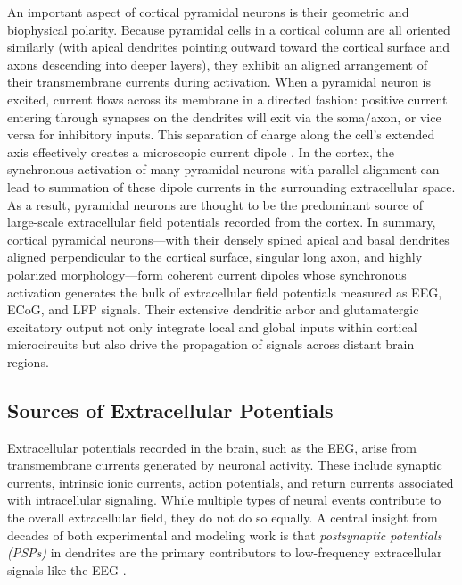 \documentclass[final, a4paper,masters,en,listoffigures,listoftables,norwegiandates]{NMBU}
\begin{document}
An important aspect of cortical pyramidal neurons is their geometric and biophysical polarity. Because pyramidal cells in a cortical column are all oriented similarly (with apical dendrites pointing outward toward the cortical surface and axons descending into deeper layers), they exhibit an aligned arrangement of their transmembrane currents during activation. When a pyramidal neuron is excited, current flows across its membrane in a directed fashion: positive current entering through synapses on the dendrites will exit via the soma/axon, or vice versa for inhibitory inputs. This separation of charge along the cell’s extended axis effectively creates a microscopic current dipole \cite{Halnes2024ElectricBrainSignals}. In the cortex, the synchronous activation of many pyramidal neurons with parallel alignment can lead to summation of these dipole currents in the surrounding extracellular space. As a result, pyramidal neurons are thought to be the predominant source of large-scale extracellular field potentials recorded from the cortex. In summary, cortical pyramidal neurons—with their densely spined apical and basal dendrites aligned perpendicular to the cortical surface, singular long axon, and highly polarized morphology—form coherent current dipoles whose synchronous activation generates the bulk of extracellular field potentials measured as EEG, ECoG, and LFP signals. Their extensive dendritic arbor and glutamatergic excitatory output not only integrate local and global inputs within cortical microcircuits but also drive the propagation of signals across distant brain regions.

\subsection{Sources of Extracellular Potentials}

Extracellular potentials recorded in the brain, such as the EEG, arise from transmembrane currents generated by neuronal activity. These include synaptic currents, intrinsic ionic currents, action potentials, and return currents associated with intracellular signaling. While multiple types of neural events contribute to the overall extracellular field, they do not do so equally. A central insight from decades of both experimental and modeling work is that \textit{postsynaptic potentials (PSPs)} in dendrites are the primary contributors to low-frequency extracellular signals like the EEG \cite{kandel2021principles, Halnes2024ElectricBrainSignals, BIASIUCCI2019R80}.
\end{document}
